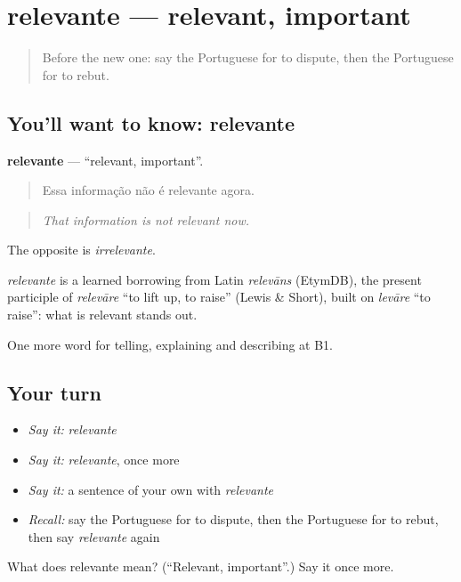 \section[relevante]{relevante — relevant, important}

\label{lesson:PT-C347-relevante}



\begin{quote}
Before the new one: say the Portuguese for to dispute, then the Portuguese for to rebut.
\end{quote}

\subsection*{You'll want to know: relevante}
\textbf{relevante} — \textquotedblleft{}relevant, important\textquotedblright{}.

\begin{quote}
Essa informação não é relevante agora.
\end{quote}

\begin{quote}
\emph{That information is not relevant now.}
\end{quote}

The opposite is \emph{irrelevante}.

\begin{cousinweb}
\emph{relevante} is a learned borrowing from Latin \emph{relevāns} (EtymDB), the present participle of \emph{relevāre} \textquotedblleft{}to lift up, to raise\textquotedblright{} (Lewis \& Short), built on \emph{levāre} \textquotedblleft{}to raise\textquotedblright{}: what is relevant stands out.
\end{cousinweb}

\begin{grammarlens}[title={What you've built}]
One more word for telling, explaining and describing at B1.
\end{grammarlens}

\subsection*{Your turn}
\begin{itemize}
\raggedright
  \item \emph{Say it:} \emph{relevante}
  \item \emph{Say it:} \emph{relevante}, once more
  \item \emph{Say it:} a sentence of your own with \emph{relevante}
  \item \emph{Recall:} say the Portuguese for to dispute, then the Portuguese for to rebut, then say \emph{relevante} again
\end{itemize}

\begin{tcolorbox}[breakable,colback=teal!4,colframe=teal!35!black,title={Before you move on}]
What does relevante mean? (\textquotedblleft{}Relevant, important\textquotedblright{}.) Say it once more.
\end{tcolorbox}
